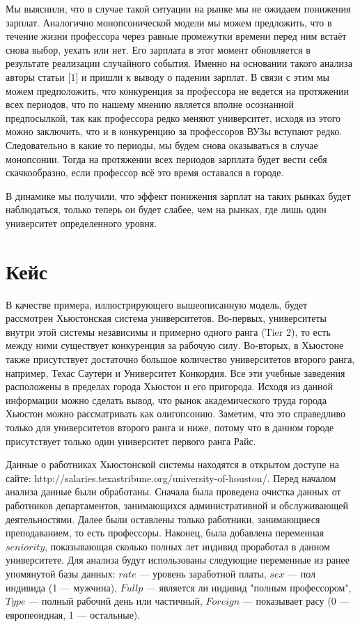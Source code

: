 \documentclass[a4paper, 12pt]{article}
\theoremstyle{definition}
\theoremstyle{plain}
\begin{document}
Мы выяснили, что в случае такой ситуации на рынке мы не ожидаем понижения зарплат. Аналогично монопсонической модели мы можем предложить, что в течение жизни профессора через равные промежутки времени перед ним встаёт снова выбор, уехать или нет.  Его зарплата в этот момент обновляется в результате реализации случайного события.  Именно на основании такого анализа авторы статьи [1] и пришли к выводу о падении зарплат. В связи с этим мы можем предположить, что конкуренция за профессора не ведется на протяжении всех периодов, что по нашему мнению является вполне осознанной предпосылкой, так как профессора редко меняют университет, исходя из этого можно заключить, что и в конкуренцию за профессоров ВУЗы вступают редко. Следовательно в какие то периоды, мы будем снова оказываться в случае монопсонии. Тогда на протяжении всех периодов зарплата будет вести себя скачкообразно, если профессор всё это время оставался в городе. %

В динамике мы получили, что эффект понижения зарплат на таких рынках будет наблюдаться, только теперь он будет  слабее, чем на рынках, где лишь один университет определенного уровня.

\section{Кейс}

В качестве примера, иллюстрирующего вышеописанную модель, будет рассмотрен Хьюстонская система университетов. Во-первых, университеты внутри этой системы независимы и примерно одного ранга (Tier 2), то есть между ними существует конкуренция за рабочую силу. Во-вторых, в Хьюстоне также присутствует достаточно большое количество университетов второго ранга, например, Техас Саутерн и Университет Конкордия. Все эти учебные заведения расположены в пределах города Хьюстон и его пригорода. Исходя из данной информации можно сделать вывод, что рынок академического труда города Хьюстон можно рассматривать как олигопсонию. Заметим, что это справедливо только для университетов второго ранга и ниже, потому что в данном городе присутствует только один университет первого ранга Райс.

Данные о работниках Хьюстонской системы находятся в открытом доступе на сайте: http://salaries.texastribune.org/university-of-houston/. Перед началом анализа данные были обработаны. Сначала была проведена очистка данных от работников департаментов, занимающихся административной и обслуживающей деятельностями. Далее были оставлены только работники, занимающиеся преподаванием, то есть профессоры. Наконец, была добавлена переменная $seniority$, показывающая сколько полных лет индивид проработал в данном университете.
Для анализа будут использованы следующие переменные из ранее упомянутой базы данных: $rate$ --- уровень заработной платы, $sex$ --- пол индивида (1 --- мужчина), $Fullp$ --- является ли индивид "полным профессором", $Type$ --- полный рабочий день или частичный, $Foreign$ --- показывает расу (0 --- европеоидная, 1 --- остальные).
\end{document}
